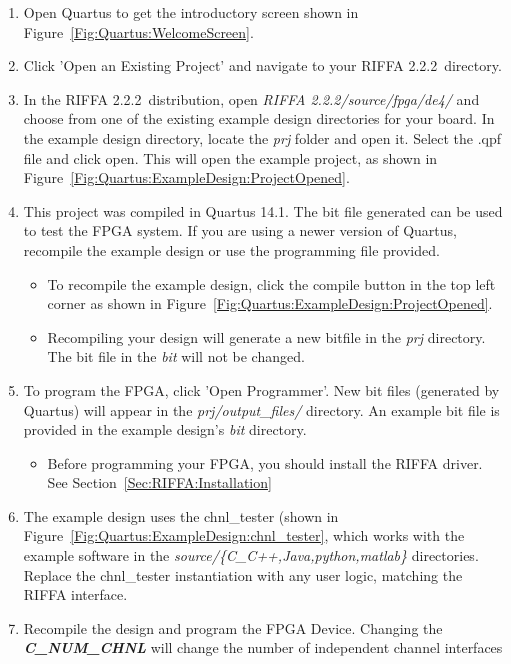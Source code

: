 \documentclass{refrep}
\newcommand{\QuartusVer}{14.1}
\newcommand{\RIFFAVer}{2.2.2}
\newcommand{\Directory}[1]{\textit{#1}}
\newcommand{\RIFFAParameter}[1]{\textit{\textbf{#1}}}
\begin{document}
\begin{enumerate}
\item Open Quartus to get the introductory screen shown in
  Figure~\ref{Fig:Quartus:WelcomeScreen}.
\item Click 'Open an Existing Project' and navigate to your RIFFA
  \RIFFAVer~directory.
\item In the RIFFA \RIFFAVer~distribution, open \Directory{RIFFA
  \RIFFAVer/source/fpga/de4/} and choose from one of the existing example design
  directories for your board. In the example design directory, locate the
  \Directory{prj} folder and open it. Select the .qpf file and click open. This
  will open the example project, as shown in
  Figure~\ref{Fig:Quartus:ExampleDesign:ProjectOpened}.
\item This project was compiled in Quartus \QuartusVer. The bit file generated
  can be used to test the FPGA system. If you are using a newer version of
  Quartus, recompile the example design or use the programming file provided.
  \begin{itemize}
  \item To recompile the example design, click the compile button in the top
    left corner as shown in
    Figure~\ref{Fig:Quartus:ExampleDesign:ProjectOpened}.
  \item Recompiling your design will generate a new bitfile in the
    \Directory{prj} directory. The bit file in the \Directory{bit} will not be
    changed.
  \end{itemize}
\item To program the FPGA, click 'Open Programmer'. New bit files (generated by
  Quartus) will appear in the \Directory{prj/output\_files/} directory. An example
  bit file is provided in the example design's \Directory{bit} directory.
  \begin{itemize}
  \item Before programming your FPGA, you should install the RIFFA driver. See
    Section~\ref{Sec:RIFFA:Installation}
  \end{itemize}
\item The example design uses the chnl\_tester (shown in
  Figure~\ref{Fig:Quartus:ExampleDesign:chnl_tester}, which works with
  the example software in the \Directory{source/\{C\_C++,Java,python,matlab\}}
  directories. Replace the chnl\_tester instantiation with any user logic,
  matching the RIFFA interface.
\item Recompile the design and program the FPGA Device. Changing the
  \RIFFAParameter{C\_NUM\_CHNL} will change the number of independent channel
  interfaces
\end{enumerate}
\end{document}

